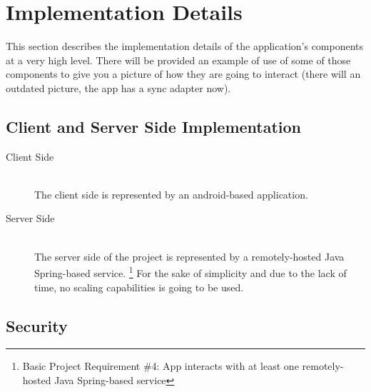 \documentclass{article}
\begin{document}
\newpage

\section{Implementation Details}

This section describes the implementation details of the application's components at a very high level. There will be provided an example of use of some of those components to give you a picture of how they are going to interact (there will an outdated picture, the app has a sync adapter now).

\newpage

    \subsection{Client and Server Side Implementation}
    
    \begin{description}
        \item[Client Side] \hfill \\
            The client side is represented by an android-based application.
        \item[Server Side] \hfill \\
            The server side of the project is represented by a remotely-hosted Java Spring-based service.
            \footnote{Basic Project Requirement \#4: App interacts with at least one remotely-hosted Java Spring-based service} 
            For the sake of simplicity and due to the lack of time, no scaling capabilities is going to be used.
    \end{description}

    \subsection{Security}
\end{document}

